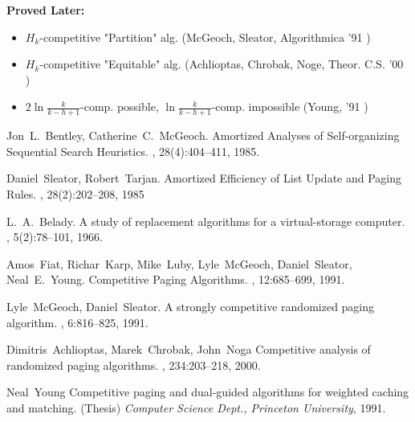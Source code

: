 \documentclass[11pt]{article}
\begin{document}
{\bf Proved Later:}
\begin{itemize}
	\item $H_k$-competitive "Partition" alg. (McGeoch, Sleator, Algorithmica '91 \cite{mcgeoch91})
	\item $H_k$-competitive "Equitable" alg. (Achlioptas, Chrobak, Noge, Theor. C.S. '00 \cite{achli00})
	\item $2\ln\frac{k}{k-h+1}$-comp. possible, $\ln\frac{k}{k-h+1}$-comp. impossible (Young, '91 \cite{young91})
\end{itemize}




\begin{thebibliography}{42}

Jon~L.~Bentley, Catherine~C.~McGeoch.
\newblock Amortized Analyses of Self-organizing Sequential Search Heuristics.
, 28(4):404--411, 1985.

Daniel~Sleator, Robert~Tarjan.
\newblock Amortized Efficiency of List Update and Paging Rules.
, 28(2):202--208, 1985

L.~A.~Belady.
\newblock A study of replacement algorithms for a virtual-storage computer.
, 5(2):78--101, 1966.

Amos~Fiat, Richar~Karp, Mike~Luby, Lyle~McGeoch, Daniel~Sleator, Neal~E.~Young.
\newblock Competitive Paging Algorithms.
, 12:685--699, 1991.

Lyle~McGeoch, Daniel~Sleator.
\newblock A strongly competitive randomized paging algorithm.
, 6:816--825, 1991.

Dimitris~Achlioptas, Marek~Chrobak, John~Noga
\newblock Competitive analysis of randomized paging algorithms.
, 234:203--218, 2000.

Neal~Young
\newblock Competitive paging and dual-guided algorithms for weighted caching and matching.  
\newblock (Thesis) {\em Computer Science Dept., Princeton University}, 1991.

\end{thebibliography}
\end{document}
